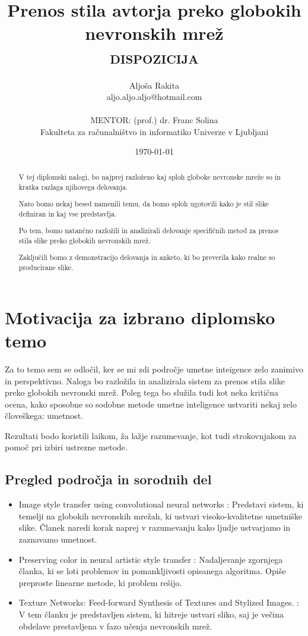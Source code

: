 \documentclass[11pt,a4paper]{article}
\title{Prenos stila avtorja preko globokih nevronskih mrež\\
\textsc{dispozicija}}
\author{Aljoša Rakita\\
aljo.aljo.aljo@hotmail.com\\
\ \\
MENTOR: (prof.) dr. Franc Solina \\
Fakulteta za računalništvo in informatiko Univerze v Ljubljani
\date{\today}         
}
\begin{document}
\maketitle

\begin{abstract}
V tej diplomski nalogi, bo najprej razloženo kaj sploh globoke nevronske mreže so in kratka razlaga njihovega delovanja.


Nato bomo nekaj besed namenili temu, da bomo sploh ugotovili kako je stil slike definiran in kaj vse predstavlja.


Po tem, bomo natančno razložili in analizirali delovanje specifičnih metod za prenos stila slike preko globokih nevronskih mrež.


Zaključili bomo z demonstracijo delovanja in anketo, ki bo preverila kako realne so producirane slike.

\end{abstract}


\section{Motivacija za izbrano diplomsko temo}

Za to temo sem se odločil, ker se mi zdi področje umetne inteigence zelo zanimivo in perspektivno. Naloga bo razložila in analizirala sistem za prenos stila slike preko globokih nevronski mrež. Poleg tega bo služila tudi kot neka kritična ocena, kako sposobne so sodobne metode umetne inteligence ustvariti nekaj zelo človeškega: umetnost. 


Rezultati bodo koristili laikom, ža lažje razumevanje, kot tudi strokovnjakom za pomoč pri izbiri ustrezne metode.

\subsection{Pregled področja in sorodnih del}

\begin{itemize}
  \item Image style transfer using convolutional neural networks\cite{gatys2016image} : Predstavi sistem, ki temelji na globokih nevronskih mrežah, ki ustvari visoko-kvalitetne umetniške slike. Članek naredi korak naprej v razumevanju kako ljudje ustvarjamo in zaznavamo umetnost.
  \item Preserving color in neural artistic style transfer\cite{gatys2016preserving} : Nadaljevanje zgornjega članka, ki se loti problemov in pomankljivosti opisanega algoritma. Opiše preproste linearne metode, ki problem rešijo.
  \item Texture Networks: Feed-forward Synthesis of Textures and Stylized Images.\cite{ulyanov2016texture} : V tem članku je predstavljen sistem, ki hitreje ustvari sliko, saj je večina obdelave prestavljena v fazo učenja nevronskih mrež.


\end{itemize}
\end{document}
